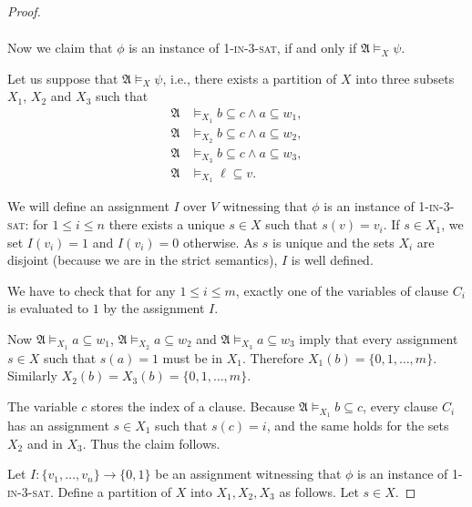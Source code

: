 \documentclass{article}
\theoremstyle{plain}
\theoremstyle{definition}
\newcommand{\mA}{{\mathfrak A}}
\newcommand{\pb}[1]{\textsc{#1}}
\def\one{w_1}
\def\two{w_2}
\def\three{w_3}
\begin{document}
\begin{proof}
\begin{table}
\[\begin{array}{c}
	\end{array}
		\]
\caption{\label{Y}}
\end{table}

	Now we claim that $\phi$ is an instance of \pb{1-in-3-sat}, if and only if 
	$ \mA \models_X \psi $.

Let us suppose that $ \mA \models_X \psi $, i.e., there exists a partition of $X$ into three subsets $X_1$, $X_2$ and $X_3$ such that 
			\begin{align*}
				\mA & \models_{X_1}  b \subseteq c \wedge a \subseteq \one,\\
				\mA & \models_{X_2} b \subseteq c \wedge a \subseteq \two,\\
				\mA & \models_{X_3} b \subseteq c \wedge a \subseteq \three,\\
				\mA & \models_{X_1} \ell \subseteq v.
			\end{align*}
			
			We will define  an assignment $I$ over $V$ witnessing that $\phi$ is an instance of \pb{1-in-3-sat}: for $1 \leq i \leq n$ there exists a unique $s \in X$ such that $ s(v)  = v_i$. If $s \in X_1$, we set $I(v_i) = 1$ and $I(v_i) = 0$ otherwise. As $s$ is unique and the sets  $X_i$ are disjoint (because we are in the strict semantics), $I$ is well defined.
			
			We have to check that for any $1 \leq i \leq m$,  exactly one of the  variables of clause $C_i$ is evaluated to $1$ by the assignment $I$.
			
		Now 	$\mA \models_{X_1} a \subseteq \one$, $\mA \models_{X_2} a \subseteq \two$ and $\mA \models_{X_3} a \subseteq \three$ imply that every assignment $s \in X$ such that $s(a) = 1$ must be in $X_1$. Therefore $X_1(b) = \{0,1,\hdots, m\}$.	Similarly $X_2(b) = X_3(b) = \{0,1,\hdots, m\}$.

			The variable  $c$  stores the index of a clause. Because $\mA \models_{X_1} b \subseteq c$, every clause $C_i$ has an assignment $s \in X_1$ such that $ s(c)  = i$, and the same holds for the sets   $X_2$ and in $X_3$. Thus the claim follows.
			
Let $I: \{v_1, \hdots, v_n\} \rightarrow \{0,1\}$ be an assignment witnessing that $\phi$ is an instance of \pb{1-in-3-sat}. Define a partition of $X$ into $X_1, X_2, X_3$ as follows. Let $s\in X$.
		

\end{proof}
\end{document}
